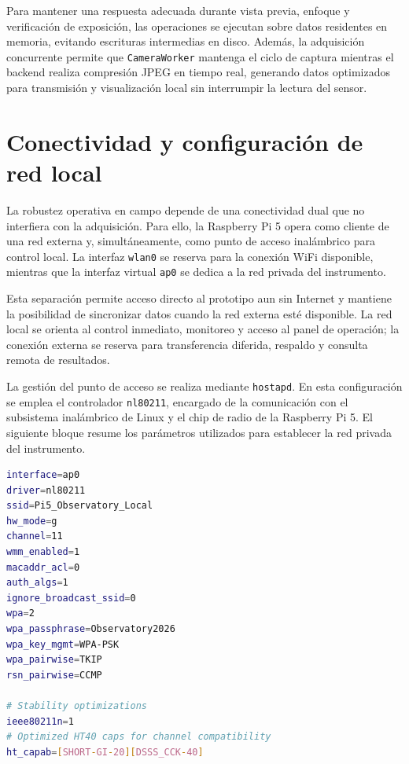 Para mantener una respuesta adecuada durante vista previa, enfoque y verificación
de exposición, las operaciones se ejecutan sobre datos residentes en memoria,
evitando escrituras intermedias en disco. Además, la adquisición concurrente
permite que \texttt{CameraWorker} mantenga el ciclo de captura mientras el backend
realiza compresión JPEG en tiempo real, generando datos optimizados para
transmisión y visualización local sin interrumpir la lectura del sensor.

\section{Conectividad y configuración de red local}
\label{sec:conectividad-hardware}

La robustez operativa en campo depende de una conectividad dual que no interfiera
con la adquisición. Para ello, la Raspberry Pi 5 opera como cliente de una red
externa y, simultáneamente, como punto de acceso inalámbrico para control local.
La interfaz \texttt{wlan0} se reserva para la conexión WiFi disponible, mientras
que la interfaz virtual \texttt{ap0} se dedica a la red privada del instrumento.

Esta separación permite acceso directo al prototipo aun sin Internet y mantiene
la posibilidad de sincronizar datos cuando la red externa esté disponible. La red
local se orienta al control inmediato, monitoreo y acceso al panel de operación;
la conexión externa se reserva para transferencia diferida, respaldo y consulta
remota de resultados.

La gestión del punto de acceso se realiza mediante \texttt{hostapd}. En esta
configuración se emplea el controlador \texttt{nl80211}, encargado de la
comunicación con el subsistema inalámbrico de Linux y el chip de radio de la
Raspberry Pi 5. El siguiente bloque resume los parámetros utilizados para
establecer la red privada del instrumento.

\begin{lstlisting}[language=bash,basicstyle=\footnotesize\ttfamily,breaklines=true,caption={Configuración del punto de acceso local mediante hostapd.},label={lst:hostapd-ap0}]
interface=ap0
driver=nl80211
ssid=Pi5_Observatory_Local
hw_mode=g
channel=11
wmm_enabled=1
macaddr_acl=0
auth_algs=1
ignore_broadcast_ssid=0
wpa=2
wpa_passphrase=Observatory2026
wpa_key_mgmt=WPA-PSK
wpa_pairwise=TKIP
rsn_pairwise=CCMP

# Stability optimizations
ieee80211n=1
# Optimized HT40 caps for channel compatibility
ht_capab=[SHORT-GI-20][DSSS_CCK-40]
\end{lstlisting}

